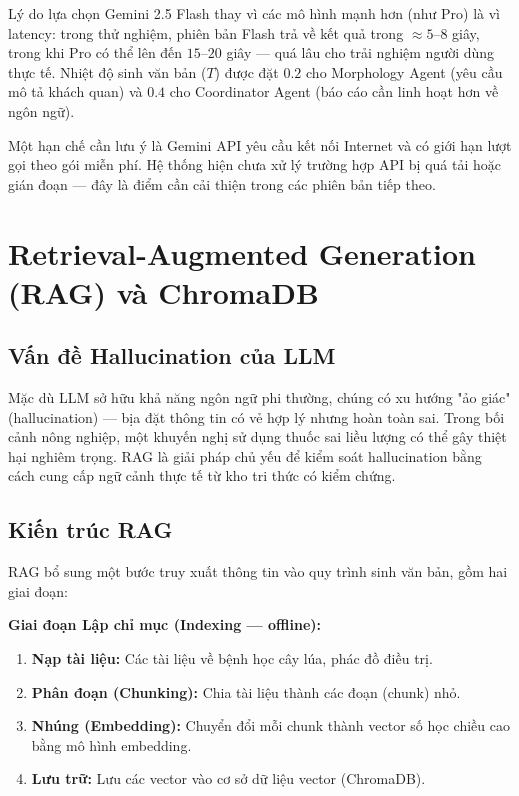 \documentclass[13pt,a4paper]{extreport}
\begin{document}
Lý do lựa chọn Gemini 2.5 Flash thay vì các mô hình mạnh hơn (như Pro) là vì latency: trong thử nghiệm, phiên bản Flash trả về kết quả trong $\approx 5$--$8$ giây, trong khi Pro có thể lên đến $15$--$20$ giây --- quá lâu cho trải nghiệm người dùng thực tế. Nhiệt độ sinh văn bản ($T$) được đặt $0.2$ cho Morphology Agent (yêu cầu mô tả khách quan) và $0.4$ cho Coordinator Agent (báo cáo cần linh hoạt hơn về ngôn ngữ).

Một hạn chế cần lưu ý là Gemini API yêu cầu kết nối Internet và có giới hạn lượt gọi theo gói miễn phí. Hệ thống hiện chưa xử lý trường hợp API bị quá tải hoặc gián đoạn --- đây là điểm cần cải thiện trong các phiên bản tiếp theo.

\section{Retrieval-Augmented Generation (RAG) và ChromaDB}

\subsection{Vấn đề Hallucination của LLM}
Mặc dù LLM sở hữu khả năng ngôn ngữ phi thường, chúng có xu hướng "ảo giác" (hallucination) --- bịa đặt thông tin có vẻ hợp lý nhưng hoàn toàn sai. Trong bối cảnh nông nghiệp, một khuyến nghị sử dụng thuốc sai liều lượng có thể gây thiệt hại nghiêm trọng. RAG là giải pháp chủ yếu để kiểm soát hallucination bằng cách cung cấp ngữ cảnh thực tế từ kho tri thức có kiểm chứng.

\subsection{Kiến trúc RAG}
RAG bổ sung một bước truy xuất thông tin vào quy trình sinh văn bản, gồm hai giai đoạn:

\textbf{Giai đoạn Lập chỉ mục (Indexing --- offline):}
\begin{enumerate}[leftmargin=1.5cm]
    \item \textbf{Nạp tài liệu:} Các tài liệu về bệnh học cây lúa, phác đồ điều trị.
    \item \textbf{Phân đoạn (Chunking):} Chia tài liệu thành các đoạn (chunk) nhỏ.
    \item \textbf{Nhúng (Embedding):} Chuyển đổi mỗi chunk thành vector số học chiều cao bằng mô hình embedding.
    \item \textbf{Lưu trữ:} Lưu các vector vào cơ sở dữ liệu vector (ChromaDB).
\end{enumerate}
\end{document}

